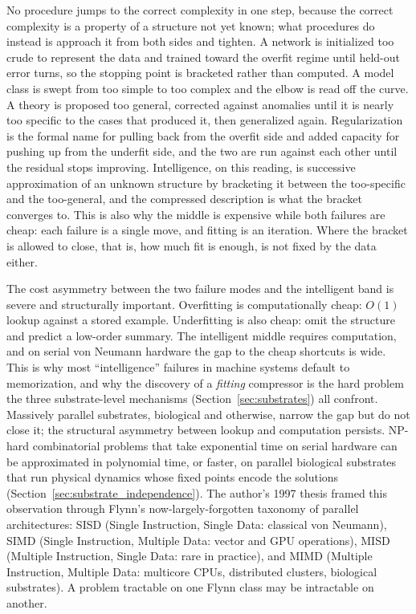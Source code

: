 \documentclass[11pt]{article}
\begin{document}
No procedure jumps to the correct complexity in one step, because the correct complexity is a property of a structure not yet known; what procedures do instead is approach it from both sides and tighten. A network is initialized too crude to represent the data and trained toward the overfit regime until held-out error turns, so the stopping point is bracketed rather than computed. A model class is swept from too simple to too complex and the elbow is read off the curve. A theory is proposed too general, corrected against anomalies until it is nearly too specific to the cases that produced it, then generalized again. Regularization is the formal name for pulling back from the overfit side and added capacity for pushing up from the underfit side, and the two are run against each other until the residual stops improving. Intelligence, on this reading, is successive approximation of an unknown structure by bracketing it between the too-specific and the too-general, and the compressed description is what the bracket converges to. This is also why the middle is expensive while both failures are cheap: each failure is a single move, and fitting is an iteration. Where the bracket is allowed to close, that is, how much fit is enough, is not fixed by the data either.

The cost asymmetry between the two failure modes and the intelligent band is severe and structurally important. Overfitting is computationally cheap: $O(1)$ lookup against a stored example. Underfitting is also cheap: omit the structure and predict a low-order summary. The intelligent middle requires computation, and on serial von Neumann hardware the gap to the cheap shortcuts is wide. This is why most ``intelligence'' failures in machine systems default to memorization, and why the discovery of a \emph{fitting} compressor is the hard problem the three substrate-level mechanisms (Section~\ref{sec:substrates}) all confront. Massively parallel substrates, biological and otherwise, narrow the gap but do not close it; the structural asymmetry between lookup and computation persists. NP-hard combinatorial problems that take exponential time on serial hardware can be approximated in polynomial time, or faster, on parallel biological substrates that run physical dynamics whose fixed points encode the solutions (Section~\ref{sec:substrate_independence}). The author's 1997 thesis \citep{gavrilov_1997} framed this observation through Flynn's now-largely-forgotten taxonomy of parallel architectures: SISD (Single Instruction, Single Data: classical von Neumann), SIMD (Single Instruction, Multiple Data: vector and GPU operations), MISD (Multiple Instruction, Single Data: rare in practice), and MIMD (Multiple Instruction, Multiple Data: multicore CPUs, distributed clusters, biological substrates). A problem tractable on one Flynn class may be intractable on another.
\end{document}
